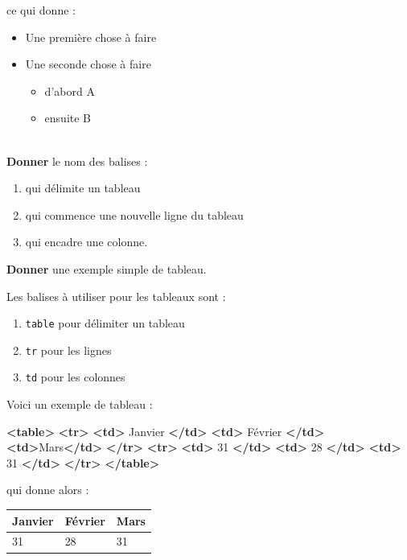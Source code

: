 \documentclass[a4paper,17pt]{extarticle}
\newenvironment{eleve}%
{\begin{activite}\color{noiramu}\\}
{\end{activite}}
\providecommand{\tightlist}{%
      \setlength{\itemsep}{0pt}\setlength{\parskip}{0pt}}
\newenvironment{Shaded}{}{}
\newcommand{\KeywordTok}[1]{\textcolor[rgb]{0.00,0.44,0.13}{\textbf{{#1}}}}
\newcommand{\NormalTok}[1]{{#1}}
\begin{document}
\begin{reponse}
ce qui donne :

\begin{itemize}
\tightlist
\item
  Une première chose à faire
\item
  Une seconde chose à faire

  \begin{itemize}
  \tightlist
  \item
    d'abord A
  \item
    ensuite B
  \end{itemize}
\end{itemize}

            \end{reponse}\begin{eleve}
    \textbf{Donner} le nom des balises :

\begin{enumerate}
\def\labelenumi{\arabic{enumi}.}
\tightlist
\item
  qui délimite un tableau
\item
  qui commence une nouvelle ligne du tableau
\item
  qui encadre une colonne.
\end{enumerate}

\textbf{Donner} une exemple simple de tableau.
        
        \end{eleve}\begin{reponse}
    Les balises à utiliser pour les tableaux sont :

\begin{enumerate}
\def\labelenumi{\arabic{enumi}.}
\tightlist
\item
  \texttt{table} pour délimiter un tableau
\item
  \texttt{tr} pour les lignes
\item
  \texttt{td} pour les colonnes
\end{enumerate}

Voici un exemple de tableau :

\begin{Shaded}
\begin{Highlighting}[]
\KeywordTok{<table>}
    \KeywordTok{<tr>}
        \KeywordTok{<td>}\NormalTok{ Janvier }\KeywordTok{</td>} \KeywordTok{<td>}\NormalTok{ Février }\KeywordTok{</td>} \KeywordTok{<td>}\NormalTok{Mars}\KeywordTok{</td>}
    \KeywordTok{</tr>}
    \KeywordTok{<tr>}
        \KeywordTok{<td>}\NormalTok{ 31 }\KeywordTok{</td>} \KeywordTok{<td>}\NormalTok{ 28 }\KeywordTok{</td>} \KeywordTok{<td>}\NormalTok{ 31 }\KeywordTok{</td>}
    \KeywordTok{</tr>}
\KeywordTok{</table>}
\end{Highlighting}
\end{Shaded}

qui donne alors :

\begin{longtable}[]{@{}lll@{}}
\toprule
Janvier & Février & Mars\tabularnewline
\midrule
\endhead
31 & 28 & 31\tabularnewline
\bottomrule
\end{longtable}

            \end{reponse}
\end{document}
